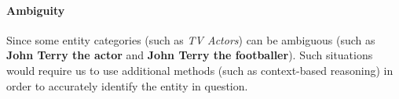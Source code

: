 \paragraph{Ambiguity}
Since some entity categories (such as \textit{TV Actors}) can be ambiguous (such as \textbf{John Terry the actor} and \textbf{John Terry the footballer}). Such situations
would require us to use additional methods (such as context-based reasoning) in order to accurately identify the entity in question.

